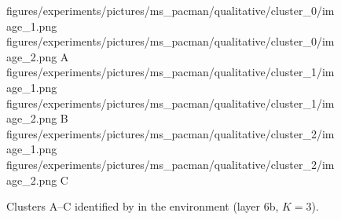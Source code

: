 \begin{figure}[H]
    \qualitativeClusterFigureSetup
    \qualitativeClusterTwo
        {figures/experiments/pictures/ms_pacman/qualitative/cluster_0/image_1.png}
        {figures/experiments/pictures/ms_pacman/qualitative/cluster_0/image_2.png}
        {A}
    \qualitativeClusterTwo
        {figures/experiments/pictures/ms_pacman/qualitative/cluster_1/image_1.png}
        {figures/experiments/pictures/ms_pacman/qualitative/cluster_1/image_2.png}
        {B}
    \qualitativeClusterTwo
        {figures/experiments/pictures/ms_pacman/qualitative/cluster_2/image_1.png}
        {figures/experiments/pictures/ms_pacman/qualitative/cluster_2/image_2.png}
        {C}
    \caption{Clusters A--C identified by  in the \MsPacManName environment (layer 6b, $K=3$).}
    \label{fig:qualitative_ms_pacman}
\end{figure}
